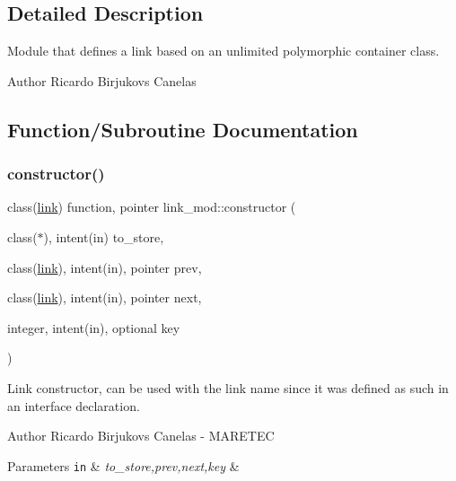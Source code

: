 \subsection{Detailed Description}
Module that defines a link based on an unlimited polymorphic container class. 

\begin{DoxyAuthor}{Author}
Ricardo Birjukovs Canelas 
\end{DoxyAuthor}


\subsection{Function/\+Subroutine Documentation}
\mbox{\label{namespacelink__mod_ac5b4f1702d8edb10a4559f6f371dc797}} 
\subsubsection{\texorpdfstring{constructor()}{constructor()}}
{\footnotesize\ttfamily class(\mbox{\hyperlink{structlink__mod_1_1link}{link}}) function, pointer link\+\_\+mod\+::constructor (\begin{DoxyParamCaption}\item[{class($\ast$), intent(in)}]{to\+\_\+store,  }\item[{class(\mbox{\hyperlink{structlink__mod_1_1link}{link}}), intent(in), pointer}]{prev,  }\item[{class(\mbox{\hyperlink{structlink__mod_1_1link}{link}}), intent(in), pointer}]{next,  }\item[{integer, intent(in), optional}]{key }\end{DoxyParamCaption})\hspace{0.3cm}{\ttfamily [private]}}



Link constructor, can be used with the \textquotesingle{}link\textquotesingle{} name since it was defined as such in an interface declaration. 

\begin{DoxyAuthor}{Author}
Ricardo Birjukovs Canelas -\/ M\+A\+R\+E\+T\+EC 
\end{DoxyAuthor}

\begin{DoxyParams}[1]{Parameters}
\mbox{\tt in}  & {\em to\+\_\+store,prev,next,key} & \\
\hline
\end{DoxyParams}


